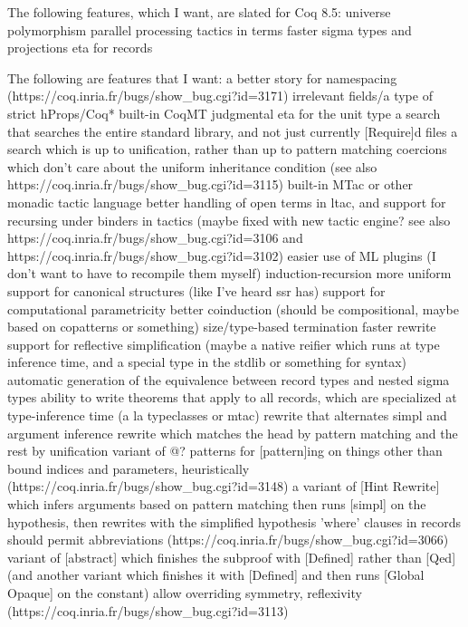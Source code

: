 \usepackage{beamer}


\begin{frame}
The following features, which I want, are slated for Coq 8.5:
universe polymorphism
parallel processing
tactics in terms
faster sigma types and projections
eta for records

The following are features that I want:
a better story for namespacing (https://coq.inria.fr/bugs/show_bug.cgi?id=3171)
irrelevant fields/a type of strict hProps/Coq*
built-in CoqMT
judgmental eta for the unit type
a search that searches the entire standard library, and not just currently [Require]d files
a search which is up to unification, rather than up to pattern matching
coercions which don't care about the uniform inheritance condition (see also https://coq.inria.fr/bugs/show_bug.cgi?id=3115)
built-in MTac or other monadic tactic language
better handling of open terms in ltac, and support for recursing under binders in tactics (maybe fixed with new tactic engine? see also https://coq.inria.fr/bugs/show_bug.cgi?id=3106 and https://coq.inria.fr/bugs/show_bug.cgi?id=3102)
easier use of ML plugins (I don't want to have to recompile them myself)
induction-recursion
more uniform support for canonical structures (like I've heard ssr has)
support for computational parametricity
better coinduction (should be compositional, maybe based on copatterns or something)
size/type-based termination
faster rewrite
support for reflective simplification (maybe a native reifier which runs at type inference time, and a special type in the stdlib or something for syntax)
automatic generation of the equivalence between record types and nested sigma types
ability to write theorems that apply to all records, which are specialized at type-inference time (a la typeclasses or mtac)
rewrite that alternates simpl and argument inference
rewrite which matches the head by pattern matching and the rest by unification
variant of @? patterns for [pattern]ing on things other than bound indices and parameters, heuristically (https://coq.inria.fr/bugs/show_bug.cgi?id=3148)
a variant of [Hint Rewrite] which infers arguments based on pattern matching then runs [simpl] on the hypothesis, then rewrites with the simplified hypothesis
'where' clauses in records should permit abbreviations (https://coq.inria.fr/bugs/show_bug.cgi?id=3066)
variant of [abstract] which finishes the subproof with [Defined] rather than [Qed] (and another variant which finishes it with [Defined] and then runs [Global Opaque] on the constant)
allow overriding symmetry, reflexivity (https://coq.inria.fr/bugs/show_bug.cgi?id=3113)

\end{frame}
